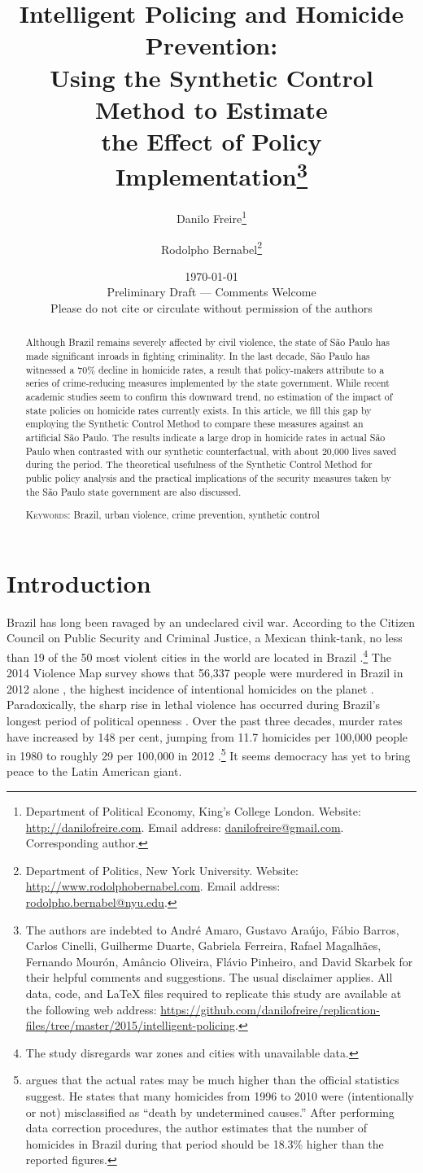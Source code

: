 \documentclass[a4paper,11pt]{article}
\title{Intelligent Policing and Homicide Prevention:\\ Using the Synthetic Control Method to Estimate\\ the Effect of Policy Implementation\thanks{The authors are indebted to Andr\'{e} Amaro, Gustavo Ara\'{u}jo, F\'{a}bio Barros, Carlos Cinelli, Guilherme Duarte, Gabriela Ferreira, Rafael Magalh\~{a}es, Fernando Mour\'{o}n, Am\^{a}ncio Oliveira, Fl\'{a}vio Pinheiro, and David Skarbek for their helpful comments and suggestions. The usual disclaimer applies. All data, code, and \LaTeX \hspace{.001cm} files required to replicate this study are available at the following web address: \href{https://github.com/danilofreire/replication-files/tree/master/2015/intelligent-policing}{https://github.com/danilofreire/replication-files/tree/master/2015/intelligent-policing}.}}
\author{
Danilo Freire\thanks{Department of Political Economy, King's College London. Website: \href{http://danilofreire.com}{http://danilofreire.com}. Email address: \href{mailto:danilofreire@gmail.com}{danilofreire@gmail.com}. Corresponding author.}
\and Rodolpho Bernabel\thanks{Department of Politics, New York University. Website: \href{http://www.rodolphobernabel.com}{http://www.rodolphobernabel.com}. Email address: \href{mailto:rodolpho.bernabel@nyu.edu}{rodolpho.bernabel@nyu.edu}.}
}
\date{\today\\
\vspace{2cm}
Preliminary Draft --- Comments Welcome\\
\vspace{.25cm}
Please do not cite or circulate without permission of the authors
}
\begin{document}
\maketitle

\begin{abstract}

\onehalfspacing

Although Brazil remains severely affected by civil violence, the state of S\~{a}o Paulo has made significant inroads in fighting criminality. In the last decade, S\~{a}o Paulo has witnessed a 70\% decline in homicide rates, a result that policy-makers attribute to a series of crime-reducing measures implemented by the state government. While recent academic studies seem to confirm this downward trend, no estimation of the impact of state policies on homicide rates currently exists. In this article, we fill this gap by employing the Synthetic Control Method to compare these measures against an artificial S\~{a}o Paulo. The results indicate a large drop in homicide rates in actual S\~{a}o Paulo when contrasted with our synthetic counterfactual, with about 20,000 lives saved during the period. The theoretical usefulness of the Synthetic Control Method for public policy analysis and the practical implications of the security measures taken by the S\~{a}o Paulo state government are also discussed.

\vspace{.5cm}
\noindent
\textsc{Keywords}: Brazil, urban violence, crime prevention, synthetic control
\end{abstract}

\newpage

\section{Introduction}

\doublespacing

Brazil has long been ravaged by an undeclared civil war. According to the Citizen Council on Public Security and Criminal Justice, a Mexican think-tank, no less than 19 of the 50 most violent cities in the world are located in Brazil \citep{mexico2014}.\footnote{The study disregards war zones and cities with unavailable data.} The 2014 Violence Map survey shows that 56,337 people were murdered in Brazil in 2012 alone \citep{mapa2014}, the highest incidence of intentional homicides on the planet \citep{unodc2013}. Paradoxically, the sharp rise in lethal violence has occurred during Brazil's longest period of political openness \citep{ahnen2003, pinheiro2000, pinheiro2001}. Over the past three decades, murder rates have increased by 148 per cent, jumping from 11.7 homicides per 100,000 people in 1980 to roughly 29 per 100,000 in 2012 \citep{mapa2014}.\footnote{\citet{cerqueira2013} argues that the actual rates may be much higher than the official statistics suggest. He states that many homicides from 1996 to 2010 were (intentionally or not) misclassified as ``death by undetermined causes.'' After performing data correction procedures, the author estimates that the number of homicides in Brazil during that period should be 18.3\% higher than the reported figures.}  It seems democracy has yet to bring peace to the Latin American giant.
\end{document}
